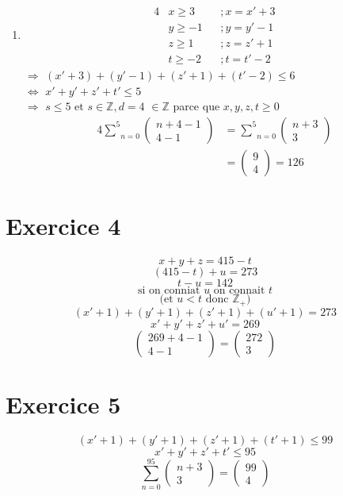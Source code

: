 \documentclass[fontsize=10pt]{article}
\begin{document}
\begin{enumerate}
\item
\begin{alignat*}{4}
 &x \geq 3 &&; x =x' +3\\
&y \geq -1 &&; y = y' -1\\
&z \geq 1 &&; z = z' +1\\
&t \geq -2 &&; t = t'-2
\end{alignat*}
$\Rightarrow$ $(x'+3)+(y'-1)+(z'+1)+(t'-2) \leq 6$\\
$\Leftrightarrow$ $x'+y'+z'+t' \leq 5$ \\
$\Rightarrow$ $s \leq 5 \text{ et } s \in \mathbb{Z}, d=4$ \hspace{3cm} $\in \mathbb{Z}$ parce que $x,y,z,t\geq 0$\\
\begin{alignat*}{4}
\underset{n=0}{\overset{5}{\sum}}
\begin{pmatrix}
n + 4 -1\\
4-1
\end{pmatrix}
&= \underset{n=0}{\overset{5}{\sum}}
\begin{pmatrix}
n+3\\
3
\end{pmatrix}\\
&= 
\begin{pmatrix}
9\\
4
\end{pmatrix} = 126
\end{alignat*}
\end{enumerate}
\section*{Exercice 4}
$$x+y+z = 415 -t$$
$$(415-t)+u = 273$$
$$t-u = 142$$
$$\text{si on conniat $u$ on connait $t$}$$
$$\text{(et $u < t$ donc $\mathbb{Z}_+$)}$$
$$ (x'+1)+(y'+1)+(z'+1)+(u'+1)=273$$
$$ x'+y'+z'+u' = 269$$
$$\begin{pmatrix}
269+4-1\\
4-1
\end{pmatrix} = 
\begin{pmatrix}
272\\
3
\end{pmatrix}
$$
\section*{Exercice 5}
$$ (x'+1)+(y'+1)+(z'+1)+(t'+1) \leq 99$$
$$ x'+y'+z'+t' \leq 95$$
$$ \underset{n=0}{\overset{95}{\sum}}
\begin{pmatrix}
n+3\\
3
\end{pmatrix} = \begin{pmatrix}
99\\
4
\end{pmatrix}$$
\end{document}
